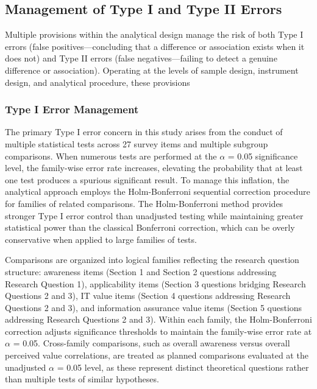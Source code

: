 \subsection{Management of Type I and Type II Errors}

Multiple provisions within the analytical design manage the risk of both Type I errors (false positives---concluding that a difference or association exists when it does not) and Type II errors (false negatives---failing to detect a genuine difference or association). Operating at the levels of sample design, instrument design, and analytical procedure, these provisions

\subsubsection{Type I Error Management}

The primary Type I error concern in this study arises from the conduct of multiple statistical tests across 27 survey items and multiple subgroup comparisons. When numerous tests are performed at the \(\alpha\) = 0.05 significance level, the family-wise error rate increases, elevating the probability that at least one test produces a spurious significant result. To manage this inflation, the analytical approach employs the Holm-Bonferroni sequential correction procedure for families of related comparisons. The Holm-Bonferroni method provides stronger Type I error control than unadjusted testing while maintaining greater statistical power than the classical Bonferroni correction, which can be overly conservative when applied to large families of tests.

Comparisons are organized into logical families reflecting the research question structure: awareness items (Section 1 and Section 2 questions addressing Research Question 1), applicability items (Section 3 questions bridging Research Questions 2 and 3), IT value items (Section 4 questions addressing Research Questions 2 and 3), and information assurance value items (Section 5 questions addressing Research Questions 2 and 3). Within each family, the Holm-Bonferroni correction adjusts significance thresholds to maintain the family-wise error rate at \(\alpha\) = 0.05. Cross-family comparisons, such as overall awareness versus overall perceived value correlations, are treated as planned comparisons evaluated at the unadjusted \(\alpha\) = 0.05 level, as these represent distinct theoretical questions rather than multiple tests of similar hypotheses.

